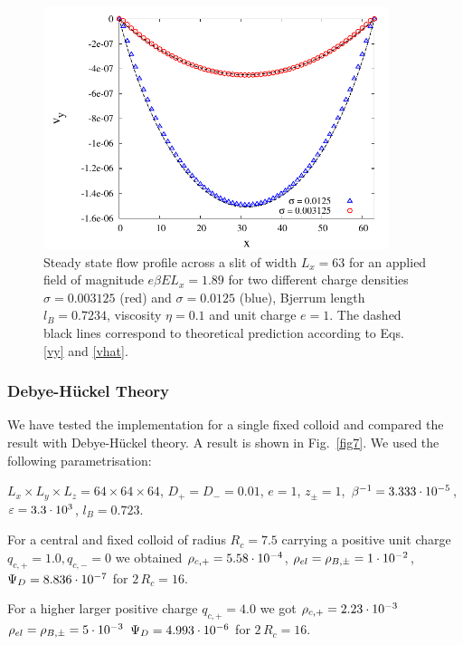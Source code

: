 \begin{figure}[htpb]
\includegraphics[width=0.9\textwidth]{./pics/test_eo.pdf}
\caption{Steady state flow profile across a slit of width $L_x=63$ for an applied field of magnitude $e \beta E L_x=1.89$ for two different charge densities $\sigma=0.003125$ (red) and $\sigma=0.0125$ (blue), Bjerrum length $l_B=0.7234$, viscosity $\eta=0.1$ and unit charge $e=1$. The dashed black lines correspond to theoretical prediction according to Eqs. \ref{vy} and \ref{vhat}.} 
\label{fig6} 
\end{figure}

\subsubsection{Debye-H\"uckel Theory}

We have tested the implementation for a single fixed
colloid and compared the result with Debye-H\"uckel theory. A result
is shown in Fig.~\ref{fig7}.
We used the following parametrisation:

$L_x \times L_y \times L_z=64\times64\times64$,
$D_+=D_-=0.01$,
$e=1$, 
$z_{\pm}=1$,
$\beta^{-1}=3.333\cdot10^{-5}$,
$\varepsilon=3.3\cdot10^{3}$,
$l_B=0.723$.

For a central and fixed colloid of radius $R_c=7.5$ carrying a positive unit charge
$q_{c,+}=1.0, q_{c,-}=0$ we obtained 
$\rho_{c,+}=5.58\cdot10^{-4}$,
$\rho_{el}=\rho_{B,\pm}=1\cdot10^{-2}$, 
$\Psi_D=8.836\cdot10^{-7}$ for $2\,R_c=16$.

For a higher larger positive charge $q_{c,+}=4.0$ we got
$\rho_{c,+}=2.23\cdot10^{-3}$
$\rho_{el}=\rho_{B,\pm}=5\cdot10^{-3}$ 
$\Psi_D=4.993\cdot10^{-6}$ for $2\,R_c=16$.

